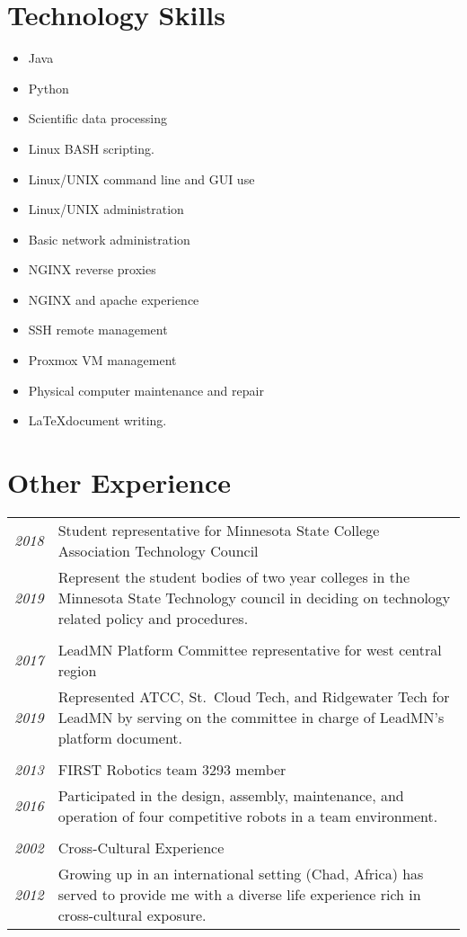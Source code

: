 \documentclass[letterpaper,10pt]{article}
\begin{document}
\section*{Technology Skills}
	\begin{multicols}{2}
	\begin{itemize}
	\item Java
	\item Python
	\item Scientific data processing
	\item Linux BASH scripting.
	\item Linux/UNIX command line and GUI use
	\item Linux/UNIX administration
	\item Basic network administration
	\item NGINX reverse proxies
	\item NGINX and apache experience
	\item SSH remote management
	\item Proxmox VM management
	\item Physical computer maintenance and repair
	\item \LaTeX document writing.
	\end{itemize}
	\end{multicols}
\section*{Other Experience}
	\begin{tabular}{R{2cm}|p{14cm}}
	\textsl{2018} & Student representative for Minnesota State College Association Technology Council\\
	\textsl{2019} & Represent the student bodies of two year colleges in the Minnesota State Technology council in deciding on technology related policy and procedures.\\
	\\
	\textsl{2017} & LeadMN Platform Committee representative for west central region\\
	\textsl{2019} & Represented ATCC, St.\ Cloud Tech, and Ridgewater Tech for LeadMN by serving on the committee in charge of LeadMN's platform document.\\
	\\
	\textsl{2013} & FIRST Robotics team 3293 member\\
	\textsl{2016} & Participated in the design, assembly, maintenance, and operation of four competitive robots in a team environment.\\
	\\
	\textsl{2002} & Cross-Cultural Experience\\
	\textsl{2012} &Growing up in an international setting (Chad, Africa) has served to provide me with a diverse life experience rich in cross-cultural exposure.\\
	\end{tabular}
\end{document}
